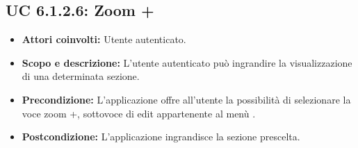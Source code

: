 \subsection{UC 6.1.2.6: Zoom +}
\begin{itemize}
		\item \textbf{Attori coinvolti:} Utente autenticato. \\
		\item \textbf{Scopo e descrizione:} L'utente autenticato può ingrandire la visualizzazione di una determinata sezione. \\
		\item \textbf{Precondizione:} L'applicazione offre all'utente la possibilità di selezionare la voce zoom +, sottovoce di edit appartenente al menù . \\
		\item \textbf{Postcondizione:} L'applicazione ingrandisce la sezione prescelta. \\
\end{itemize}